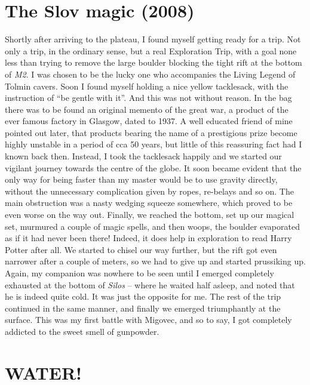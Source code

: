 
\hypertarget{the-slov-magic-2008}{%
\section{The Slov magic (2008)}\label{the-slov-magic-2008}}

Shortly after arriving to the plateau, I found myself getting ready for
a trip. Not only a trip, in the ordinary sense, but a real Exploration
Trip, with a goal none less than trying to remove the large boulder
blocking the tight rift at the bottom of \emph{M2}. I was chosen to be
the lucky one who accompanies the Living Legend of Tolmin cavers. Soon I
found myself holding a nice yellow tacklesack, with the instruction of
``be gentle with it''. And this was not without reason. In the bag there
was to be found an original memento of the great war, a product of the
ever famous factory in Glasgow, dated to 1937. A well educated friend of
mine pointed out later, that products bearing the name of a prestigious
prize become highly unstable in a period of cca 50 years, but little of
this reassuring fact had I known back then. Instead, I took the
tacklesack happily and we started our vigilant journey towards the
centre of the globe. It soon became evident that the only way for being
faster than my master would be to use gravity directly, without the
unnecessary complication given by ropes, re-belays and so on. The main
obstruction was a nasty wedging squeeze somewhere, which proved to be
even worse on the way out. Finally, we reached the bottom, set up our
magical set, murmured a couple of magic spells, and then woops, the
boulder evaporated as if it had never been there! Indeed, it does help
in exploration to read Harry Potter after all. We started to chisel our
way further, but the rift got even narrower after a couple of meters, so
we had to give up and started prussiking up. Again, my companion was
nowhere to be seen until I emerged completely exhausted at the bottom of
\emph{Silos} -- where he waited half asleep, and noted that he is indeed
quite cold. It was just the opposite for me. The rest of the trip
continued in the same manner, and finally we emerged triumphantly at the
surface. This was my first battle with Migovec, and so to say, I got
completely addicted to the sweet smell of gunpowder.


\hypertarget{water}{%
\section{WATER!}\label{water}}

